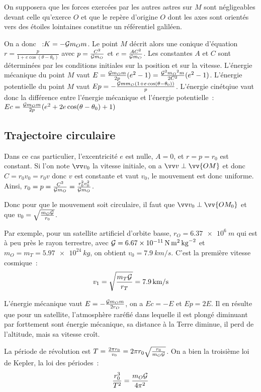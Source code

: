 On supposera que les forces exercées par les autres astres sur \(M\) sont 
négligeables devant celle qu'exerce \(O\) et que le repère d'origine \(O\) dont 
les axes sont orientés vers des étoiles lointaines constitue un référentiel
galiléen.

On a donc ~:\(K = -\mathcal{G} m_O m\). Le point \(M\) décrit alors une conique 
d'équation \(r = \frac{p}{1+e\cos(\theta - \theta_0)}\) avec \(p = 
\frac{C^2}{\mathcal{G} m_O}\) et \(e = \frac{AC^2}{\mathcal{G} m_O}\). Les constantes \(A\) et
\(C\) sont déterminées par les conditions initiales sur la position et sur la 
vitesse. L'énergie mécanique du point \(M\) vaut \(E = \frac{\mathcal{G} m_O 
m}{2p}(e^2-1) = \frac{\mathcal{G}^2{m_O}^2m}{2C^2}(e^2-1)\). L'énergie potentielle du 
point \(M\) vaut \(Ep = -\frac{\mathcal{G} m m_O (1+e\cos(\theta-\theta_0))}{p}\). 
L'énergie cinétqiue vaut donc la différence entre l'énergie mécanique et 
l'énergie potentielle~: \(Ec = \frac{\mathcal{G} m_O m}{2p}(e^2 + 
2e\cos(\theta-\theta_0)+1)\)

\subsection{Trajectoire circulaire}
Dans ce cas particulier, l'excentricité \(e\) est nulle, \(A=0\), et \(r=p=r_0\) est 
constant. Si l'on note \(\vvv_0\) la vitesse initiale, on a \(\vvv \perp \vv{OM}\)
et donc \(C = r_0 v_0 = r_0 v\) donc \(v\) est constante et vaut \(v_0\), le 
mouvement est donc uniforme.
Ainsi, \(r_0 = p = \frac{C^2}{\mathcal{G} m_O} = \frac{r_0^2v_0^2}{\mathcal{G} m_O}\).

Donc pour que le mouvement soit circulaire, il faut que \(\vvv_0 \perp 
\vv{OM_0}\) et que \(v_0 = \sqrt{\frac{m_O \mathcal{G}}{r_0}}\).

Par exemple, pour un satellite artificiel d'orbite basse, \(r_O = 
\qty{6.37e6}{m}\) qui est à peu près le rayon terrestre, avec \(\mathcal{G} = 
\qty{6.67e{-11}}{N.m^2.kg^{-2}}\) et \(m_O=m_T=\qty{5.97e24}{kg}\), on obtient 
\(v_0 = \qty{7.9}{km/s}\). C'est la première vitesse cosmique~:
\begin{equation}
  v_1 = \sqrt{\frac{m_T \mathcal{G}}{r_T}} = \qty{7.9}{km/s}
\end{equation}

L'énergie mécanique vaut \(E = -\frac{\mathcal{G} m_O m}{2r_O}\), on a \(Ec=-E\) et 
\(Ep = 2E\). Il en résulte que pour un satellite, l'atmosphère raréfié dans 
lequelle il est plongé diminuant par forttement sont énergie mécanique, sa 
distance à la Terre diminue, il perd de l'altitude, mais sa vitesse croît.

La période de révolution est \(T = \frac{2\pi r_0}{v_0} = 2\pi r_0 
\sqrt{\frac{r_0}{m_O \mathcal{G}}}\). On a bien la troisième loi de Kepler, la loi des 
périodes~:
\begin{equation}
  \frac{r_0^3}{T^2} = \frac{m_O \mathcal{G}}{4\pi^2}
\end{equation}

